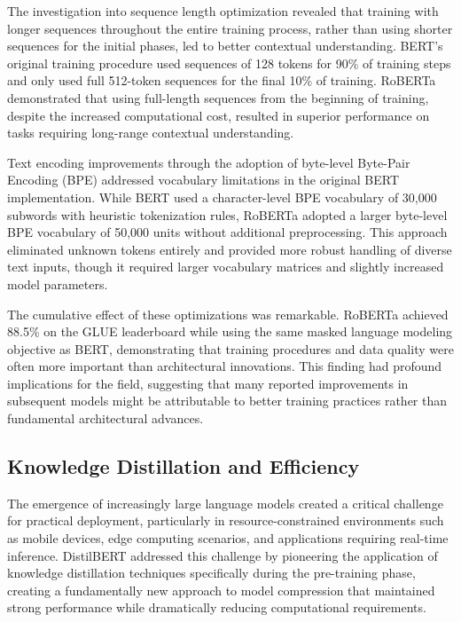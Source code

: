 \documentclass[
  titlepage]{article}
\begin{document}
The investigation into sequence length optimization revealed that
training with longer sequences throughout the entire training process,
rather than using shorter sequences for the initial phases, led to
better contextual understanding. BERT's original training procedure used
sequences of 128 tokens for 90\% of training steps and only used full
512-token sequences for the final 10\% of training. RoBERTa demonstrated
that using full-length sequences from the beginning of training, despite
the increased computational cost, resulted in superior performance on
tasks requiring long-range contextual understanding.

Text encoding improvements through the adoption of byte-level Byte-Pair
Encoding (BPE) addressed vocabulary limitations in the original BERT
implementation. While BERT used a character-level BPE vocabulary of
30,000 subwords with heuristic tokenization rules, RoBERTa adopted a
larger byte-level BPE vocabulary of 50,000 units without additional
preprocessing. This approach eliminated unknown tokens entirely and
provided more robust handling of diverse text inputs, though it required
larger vocabulary matrices and slightly increased model parameters.

The cumulative effect of these optimizations was remarkable. RoBERTa
achieved 88.5\% on the GLUE leaderboard while using the same masked
language modeling objective as BERT, demonstrating that training
procedures and data quality were often more important than architectural
innovations. This finding had profound implications for the field,
suggesting that many reported improvements in subsequent models might be
attributable to better training practices rather than fundamental
architectural advances.

\subsection{Knowledge Distillation and
Efficiency}\label{knowledge-distillation-and-efficiency}

The emergence of increasingly large language models created a critical
challenge for practical deployment, particularly in resource-constrained
environments such as mobile devices, edge computing scenarios, and
applications requiring real-time inference. DistilBERT addressed this
challenge by pioneering the application of knowledge distillation
techniques specifically during the pre-training phase, creating a
fundamentally new approach to model compression that maintained strong
performance while dramatically reducing computational requirements.
\end{document}
